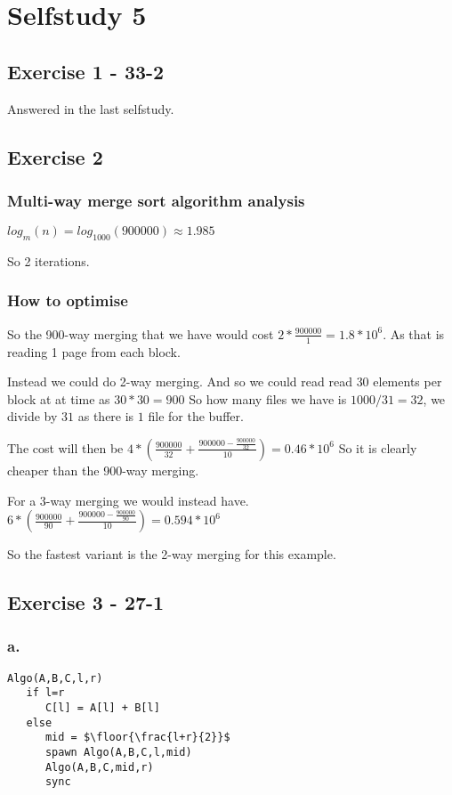 \documentclass[12pt,a4paper]{report}
\DeclarePairedDelimiter{\floor}{\lfloor}{\rfloor}
\begin{document}
\chapter*{Selfstudy 5}
\section*{Exercise 1 - 33-2}
Answered in the last selfstudy.

\section*{Exercise 2}
\subsection*{Multi-way merge sort algorithm analysis}
$log_{m}(n) = log_{1000}(900000) \approx 1.985$

So 2 iterations. 

\subsection*{How to optimise}
So the 900-way merging that we have would cost $2*\frac{900000}{1} = 1.8*10^6$.
As that is reading 1 page from each block.

Instead we could do 2-way merging.
And so we could read read $30$ elements per block at at time as $30*30 = 900$
So how many files we have is $1000/31 = 32$, we divide by $31$ as there is $1$ file for the buffer.

The cost will then be $4*(\frac{900000}{32} + \frac{900000 - \frac{900000}{32}}{10}) = 0.46*10^6$
So it is clearly cheaper than the 900-way merging.

For a 3-way merging we would instead have.
$6*(\frac{900000}{90} + \frac{900000 - \frac{900000}{90}}{10}) = 0.594*10^6$

So the fastest variant is the 2-way merging for this example.

\section*{Exercise 3 - 27-1}
\subsection*{a.}
\begin{lstlisting}
Algo(A,B,C,l,r)
   if l=r
      C[l] = A[l] + B[l]
   else
      mid = $\floor{\frac{l+r}{2}}$
      spawn Algo(A,B,C,l,mid)
      Algo(A,B,C,mid,r)
      sync
\end{lstlisting}
\end{document}
